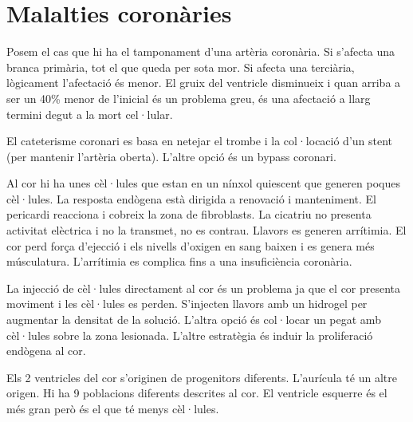 \section{Malalties coronàries}

Posem el cas que hi ha el tamponament d'una artèria coronària. Si s'afecta una branca primària, tot el que queda per sota mor. Si afecta una terciària, lògicament l'afectació és menor. El gruix del ventricle disminueix i quan arriba a ser un 40\% menor de l'inicial és un problema greu, és una afectació a llarg termini degut a la mort cel·lular.

El cateterisme coronari es basa en netejar el trombe i la col·locació d'un stent (per mantenir l'artèria oberta). L'altre opció és un bypass coronari.

Al cor hi ha unes cèl·lules que estan en un nínxol quiescent que generen poques cèl·lules. La resposta endògena està dirigida a renovació i manteniment. El pericardi reacciona i cobreix la zona de fibroblasts. La cicatriu no presenta activitat elèctrica i no la transmet, no es contrau. Llavors es generen arrítimia. El cor perd força d'ejecció i els nivells d'oxigen en sang baixen i es genera més músculatura. L'arrítimia es complica fins a una insuficiència coronària.

La injecció de cèl·lules directament al cor és un problema ja que el cor presenta moviment i les cèl·lules es perden. S'injecten llavors amb un hidrogel per augmentar la densitat de la solució. L'altra opció és col·locar un pegat amb cèl·lules sobre la zona lesionada. L'altre estratègia és induir la proliferació endògena al cor.

Els 2 ventricles del cor s'originen de progenitors diferents. L'aurícula té un altre origen. Hi ha 9 poblacions diferents descrites al cor. El ventricle esquerre és el més gran però és el que té menys cèl·lules.